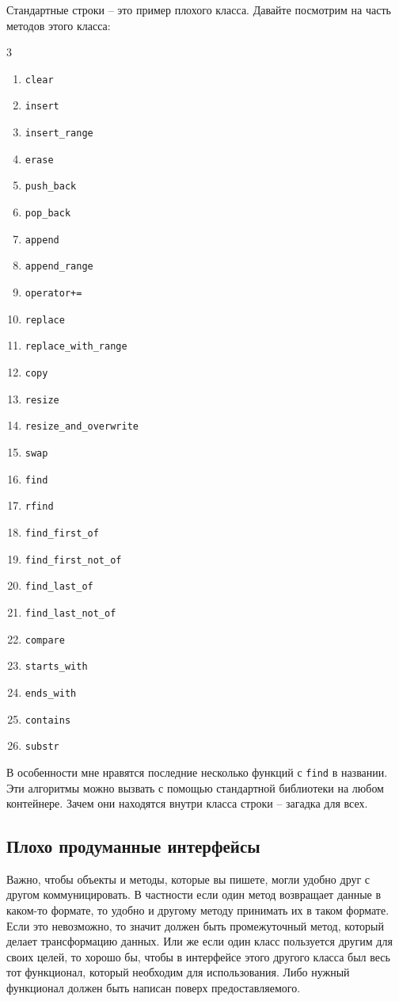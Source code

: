 Стандартные строки -- это пример плохого класса.
Давайте посмотрим на часть методов этого класса:
\begin{multicols}{3}
\begin{enumerate}
\item \texttt{clear}
\item \texttt{insert}
\item \texttt{insert\_range}
\item \texttt{erase}
\item \texttt{push\_back}
\item \texttt{pop\_back}
\item \texttt{append}
\item \texttt{append\_range}
\item \texttt{operator+=}
\item \texttt{replace}
\item \texttt{replace\_with\_range}
\item \texttt{copy}
\item \texttt{resize}
\item \texttt{resize\_and\_overwrite}
\item \texttt{swap}
\item \texttt{find}
\item \texttt{rfind}
\item \texttt{find\_first\_of}
\item \texttt{find\_first\_not\_of}
\item \texttt{find\_last\_of}
\item \texttt{find\_last\_not\_of}
\item \texttt{compare}
\item \texttt{starts\_with}
\item \texttt{ends\_with}
\item \texttt{contains}
\item \texttt{substr}
\end{enumerate}
\end{multicols}
В особенности мне нравятся последние несколько функций с \verb"find" в названии.
Эти алгоритмы можно вызвать с помощью стандартной библиотеки на любом контейнере.
Зачем они находятся внутри класса строки -- загадка для всех.

\subsection{Плохо продуманные интерфейсы}
\label{section::BadInterfaces}

Важно, чтобы объекты и методы, которые вы пишете, могли удобно друг с другом коммуницировать.
В частности если один метод возвращает данные в каком-то формате, то удобно и другому методу принимать их в таком формате.
Если это невозможно, то значит должен быть промежуточный метод, который делает трансформацию данных.
Или же если один класс пользуется другим для своих целей, то хорошо бы, чтобы в интерфейсе этого другого класса был весь тот функционал, который необходим для использования.
Либо нужный функционал должен быть написан поверх предоставляемого.

